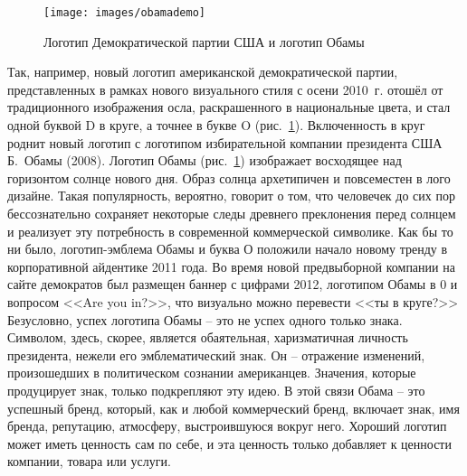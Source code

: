 \begin{figure}[h!]
  \centering
  \texttt{[image: images/obamademo]}
  \caption{Логотип Демократической партии США и логотип Обамы}
  \label{fig:obamademo}
\end{figure}

   Так, например, новый
  логотип американской демократической партии, представленных в рамках нового
  визуального стиля с осени 2010~г. отошёл от традиционного изображения осла,
  раскрашенного в национальные цвета, и стал одной буквой D в круге, а точнее
  в букве O (рис.~\ref{fig:obamademo}). Включенность в круг роднит новый логотип с логотипом
  избирательной компании президента США Б.~Обамы (2008). Логотип Обамы (рис.~\ref{fig:obamademo})
  изображает восходящее над горизонтом солнце нового дня. Образ солнца архетипичен
  и повсеместен в лого дизайне. Такая популярность, вероятно, говорит о том,
  что человечек до сих пор бессознательно сохраняет некоторые следы древнего
  преклонения перед солнцем и реализует эту потребность в современной
  коммерческой символике. Как бы то ни было, логотип-эмблема Обамы и буква О
  положили начало новому тренду в корпоративной айдентике 2011 года.
  Во время новой предвыборной компании на сайте демократов был размещен
  баннер с цифрами 2012, логотипом Обамы в 0 и вопросом <<Are you in?>>,
  что визуально можно перевести <<ты в круге?>> Безусловно, успех логотипа
  Обамы -- это не успех одного только знака. Символом, здесь, скорее,
  является обаятельная, харизматичная личность президента, нежели его
  эмблематический знак. Он -- отражение изменений, произошедших в политическом
  сознании американцев. Значения, которые продуцирует знак, только подкрепляют
  эту идею. В этой связи Обама -- это успешный бренд, который, как и любой
  коммерческий бренд, включает знак, имя бренда, репутацию, атмосферу,
  выстроившуюся вокруг него. Хороший логотип может иметь ценность сам по себе,
  и эта ценность только добавляет к ценности компании, товара или услуги.
  
